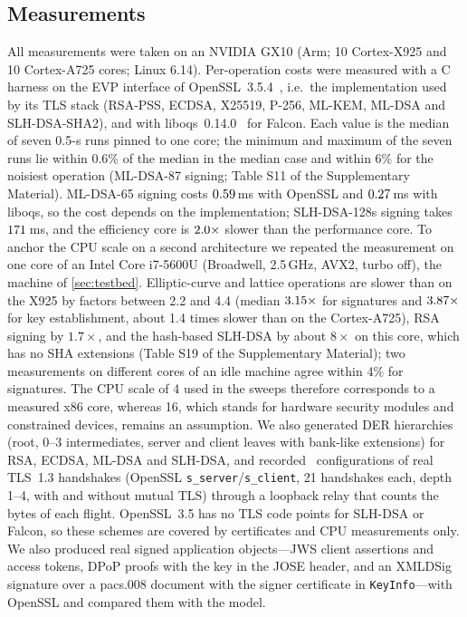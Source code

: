 \documentclass[preprint,12pt]{elsarticle}
\newcommand{\ms}{\,ms\xspace}
\newcommand{\supp}[1]{#1 of the Supplementary Material}
\begin{document}
\subsection{Measurements}
\label{sec:meas}
All measurements were taken on an NVIDIA GX10 (Arm; 10 Cortex-X925 and 10 Cortex-A725 cores; Linux 6.14). Per-operation costs were measured with a C harness on the EVP interface of OpenSSL~3.5.4~\cite{openssl35}, i.e.\ the implementation used by its TLS stack (RSA-PSS, ECDSA, X25519, P-256, ML-KEM, ML-DSA and SLH-DSA-SHA2), and with liboqs~0.14.0~\cite{stebila2016} for Falcon. Each value is the median of seven 0.5-s runs pinned to one core; the minimum and maximum of the seven runs lie within 0.6\% of the median in the median case and within 6\% for the noisiest operation (ML-DSA-87 signing; \supp{Table S11}). ML-DSA-65 signing costs $0.59$\ms with OpenSSL and $0.27$\ms with liboqs, so the cost depends on the implementation; SLH-DSA-128s signing takes $171$\ms, and the efficiency core is $2.0\times$ slower than the performance core. To anchor the CPU scale on a second architecture we repeated the measurement on one core of an Intel Core i7-5600U (Broadwell, 2.5\,GHz, AVX2, turbo off), the machine of \cref{sec:testbed}. Elliptic-curve and lattice operations are slower than on the X925 by factors between 2.2 and 4.4 (median $3.15\times$ for signatures and $3.87\times$ for key establishment, about 1.4 times slower than on the Cortex-A725), RSA signing by $1.7\times$, and the hash-based SLH-DSA by about $8\times$ on this core, which has no SHA extensions (\supp{Table S19}); two measurements on different cores of an idle machine agree within 4\% for signatures. The CPU scale of 4 used in the sweeps therefore corresponds to a measured x86 core, whereas 16, which stands for hardware security modules and constrained devices, remains an assumption. We also generated DER hierarchies (root, 0--3 intermediates, server and client leaves with bank-like extensions) for RSA, ECDSA, ML-DSA and SLH-DSA, and recorded \tlsConfigs\ configurations of real TLS~1.3 handshakes (OpenSSL \texttt{s\_server}/\texttt{s\_client}, 21 handshakes each, depth 1--4, with and without mutual TLS) through a loopback relay that counts the bytes of each flight. OpenSSL~3.5 has no TLS code points for SLH-DSA or Falcon, so these schemes are covered by certificates and CPU measurements only. We also produced real signed application objects---JWS client assertions and access tokens, DPoP proofs with the key in the JOSE header, and an XMLDSig signature over a pacs.008 document with the signer certificate in \texttt{KeyInfo}---with OpenSSL and compared them with the model.
\end{document}
